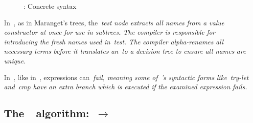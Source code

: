 \documentclass[article,screen,12pt, nonacm]{acmart}
\begin{document}
  \begin{figure}
    \begin{center}
    \dcsyntax
    \end{center}
    \caption{\D: Concrete syntax}
    \label{fig:dsyntax}
    \end{figure}



  In~\D, as in Maranget's trees, the~\it{test} node extracts all names from a
  value constructor at once for use in subtrees. The compiler is responsible for
  introducing the fresh names used in~\it{test}. The compiler alpha-renames all
  necessary terms before it translates an~\iffibf to a decision tree to ensure
  all names are unique. 

  In~\D, like in~\VMinus, expressions can~\it{fail}, meaning some of~\D's
  syntactic forms like~\it{try-let} and~\it{cmp} have an extra branch which is
  executed if the examined expression fails. 



    \subsection{The~\DTran\ algorithm:~\VMinus $\rightarrow$~\D}


\end{document}
